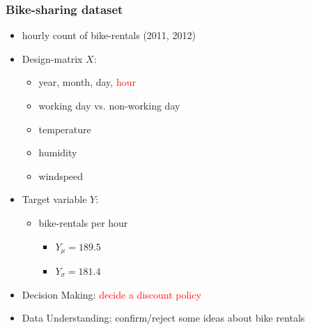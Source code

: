 \documentclass{beamer}
\newcommand{\red}[1]{\textcolor{red}{#1}}
\begin{document}


\begin{frame}
  \frametitle{Bike-sharing dataset}
  \begin{itemize}
  \item hourly count of bike-rentals (2011, 2012)
  \item Design-matrix $X$:
    \begin{itemize}
    \item year, month, day, \red{hour}
    \item working day vs. non-working day
    \item temperature
    \item humidity
    \item windspeed
    \end{itemize}
  \item Target variable $Y$:
    \begin{itemize}
    \item bike-rentals per hour
      \begin{itemize}
      \item $Y_\mu = 189.5$
      \item $Y_\sigma = 181.4$
      \end{itemize}
    \end{itemize}
  \item Decision Making: \red{decide a discount policy}
  \item Data Understanding: confirm/reject some ideas about bike rentals
  \end{itemize}
\end{frame}
\end{document}
